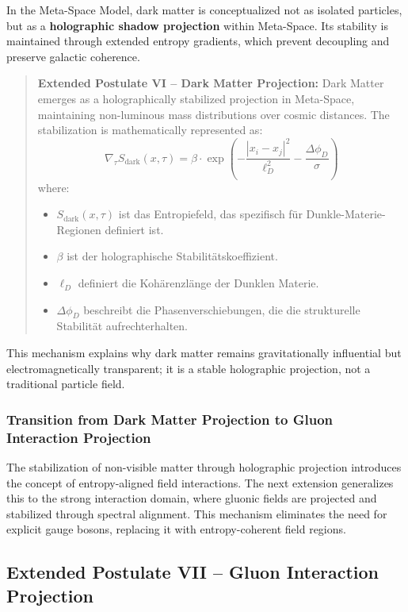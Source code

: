 \documentclass[10.5pt,a4paper]{article}
\begin{document}
In the Meta-Space Model, dark matter is conceptualized not as isolated particles, but as a \textbf{holographic 
shadow projection} within Meta-Space. Its stability is maintained through extended entropy gradients, 
which prevent decoupling and preserve galactic coherence.

\begin{quote}
\textbf{Extended Postulate VI – Dark Matter Projection:}  
Dark Matter emerges as a holographically stabilized projection in Meta-Space, maintaining non-luminous mass distributions 
over cosmic distances. The stabilization is mathematically represented as:
\[
\nabla_\tau S_{\text{dark}}(x, \tau) = \beta \cdot \exp\left(-\frac{|x_i - x_j|^2}{\ell_D^2} - \frac{\Delta \phi_D}{\sigma}\right)
\]
where:
\begin{itemize}
  \item \( S_{\text{dark}}(x, \tau) \) ist das Entropiefeld, das spezifisch für Dunkle-Materie-Regionen definiert ist.
  \item \( \beta \) ist der holographische Stabilitätskoeffizient.
  \item \( \ell_D \) definiert die Kohärenzlänge der Dunklen Materie.
  \item \( \Delta \phi_D \) beschreibt die Phasenverschiebungen, die die strukturelle Stabilität aufrechterhalten.
\end{itemize}
\end{quote}

This mechanism explains why dark matter remains gravitationally influential but electromagnetically transparent; 
it is a stable holographic projection, not a traditional particle field.

\subsubsection*{Transition from Dark Matter Projection to Gluon Interaction Projection}

The stabilization of non-visible matter through holographic projection introduces the concept of entropy-aligned 
field interactions. The next extension generalizes this to the strong interaction domain, where gluonic fields 
are projected and stabilized through spectral alignment. This mechanism eliminates the need for explicit gauge 
bosons, replacing it with entropy-coherent field regions.

\subsection{Extended Postulate VII – Gluon Interaction Projection}
\end{document}
